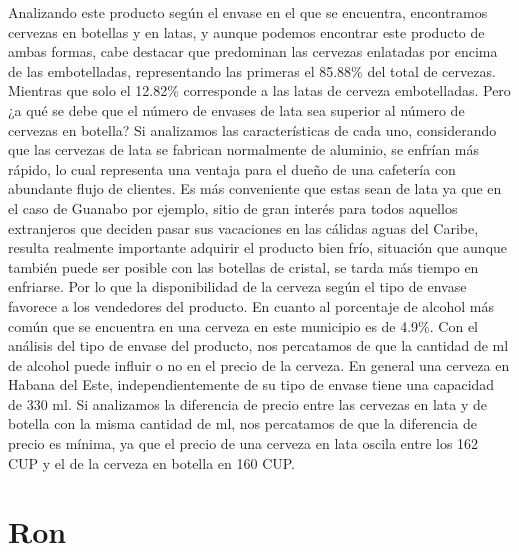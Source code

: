 \documentclass[a4paper,12pt]{article}
\begin{document}
		Analizando este producto según el envase en el que se encuentra, encontramos cervezas en botellas y en latas, y aunque podemos encontrar este producto de ambas formas, cabe destacar que predominan las cervezas enlatadas por encima de las embotelladas, representando las primeras el 85.88\% del total de cervezas. Mientras que solo el 12.82\% corresponde a las latas de cerveza embotelladas. Pero ¿a qué se debe que el número de envases de lata sea superior al número de cervezas en botella? Si analizamos las características de cada uno, considerando que las cervezas de lata se fabrican normalmente de aluminio, se enfrían más rápido, lo cual representa una ventaja para el dueño de una cafetería con abundante flujo de clientes. Es más conveniente que estas sean de lata ya que en el caso de Guanabo por ejemplo, sitio de gran interés para todos aquellos extranjeros que deciden pasar sus vacaciones en las cálidas aguas del Caribe, resulta realmente importante adquirir el producto bien frío, situación que aunque también puede ser posible con las botellas de cristal, se tarda más tiempo en enfriarse. Por lo que la disponibilidad de la cerveza según el tipo de envase favorece a los vendedores del producto. En cuanto al porcentaje de alcohol más común que se encuentra en una cerveza en este municipio es de 4.9\%. Con el análisis del tipo de envase del producto, nos percatamos de que la cantidad de ml de alcohol puede influir o no en el precio de la cerveza. En general una cerveza en Habana del Este, independientemente de su tipo de envase tiene una capacidad de 330 ml. Si analizamos la diferencia de precio entre las cervezas en lata y de botella con la misma cantidad de ml, nos percatamos de que la diferencia de precio es mínima, ya que el precio de una cerveza en lata oscila entre los 162 CUP y el de la cerveza en botella en 160 CUP.
		
	\section{Ron}
\end{document}
